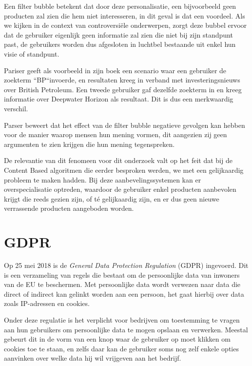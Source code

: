 Een filter bubble betekent dat door deze personalisatie, een bijvoorbeeld geen producten zal zien die hem niet interesseren, in dit geval is dat een voordeel. Als we kijken in de context van controversiële onderwerpen, zorgt deze bubbel ervoor dat de gebruiker eigenlijk geen informatie zal zien die niet bij zijn standpunt past, de gebruikers worden dus afgesloten in luchtbel bestaande uit enkel hun visie of standpunt.  \autocite{Pariser2011}

Pariser geeft als voorbeeld in zijn boek een scenario waar een gebruiker de zoekterm ``BP``invoerde, en resultaten kreeg in verband met investeringsnieuws over British Petroleum. Een tweede gebruiker gaf dezelfde zoekterm in en kreeg informatie over Deepwater Horizon als resultaat. Dit is dus een merkwaardig verschil.

Parser beweert dat het effect van de filter bubble negatieve gevolgen kan hebben voor de manier waarop mensen hun mening vormen, dit aangezien zij geen argumenten te zien krijgen die hun mening tegenspreken.


De relevantie van dit fenomeen voor dit onderzoek valt op het feit dat bij de Content Based algoritmen die eerder besproken werden, we met een gelijkaardig probleem te maken hadden. Bij deze aanbevelingssystemen kan er overspecialisatie optreden, waardoor de gebruiker enkel producten aanbevolen krijgt die reeds gezien zijn, of té gelijkaardig zijn, en er dus geen nieuwe verrassende producten aangeboden worden.

\section{GDPR}
\label{sec:GDPR}

Op 25 mei 2018 is de \textit{General Data Protection Regulation} (GDPR) ingevoerd. Dit is een verzameling van regels die bestaat om de persoonlijke data van inwoners van de EU te beschermen. Met persoonlijke data wordt verwezen naar data die direct of indirect kan gelinkt worden aan een persoon, het gaat hierbij over data zoals IP-adressen en cookies. 

Onder deze regulatie is het verplicht voor bedrijven om toestemming te vragen aan hun gebruikers om persoonlijke data te mogen opslaan en verwerken. Meestal gebeurt dit in de vorm van een knop waar de gebruiker op moet klikken om cookies toe te staan, en zelfs daar kan de gebruiker soms nog zelf enkele opties aanvinken over welke data hij wil vrijgeven aan het bedrijf. \autocite{Goddard2017}

